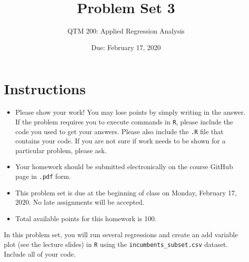 \documentclass[12pt,letterpaper]{article}
\title{Problem Set 3}
\date{Due: February 17, 2020}
\author{QTM 200: Applied Regression Analysis}
\begin{document}
	\maketitle
	
	\section*{Instructions}
	\begin{itemize}
		\item Please show your work! You may lose points by simply writing in the answer. If the problem requires you to execute commands in \texttt{R}, please include the code you used to get your answers. Please also include the \texttt{.R} file that contains your code. If you are not sure if work needs to be shown for a particular problem, please ask.
		\item Your homework should be submitted electronically on the course GitHub page in \texttt{.pdf} form.
		\item This problem set is due at the beginning of class on Monday, February 17, 2020. No late assignments will be accepted.
		\item Total available points for this homework is 100.
	\end{itemize}
	
		\vspace{.25cm}
	
\noindent In this problem set, you will run several regressions and create an add variable plot (see the lecture slides) in \texttt{R} using the \texttt{incumbents\_subset.csv} dataset. Include all of your code.
\label{key}
	\vspace{.5cm}
\end{document}
